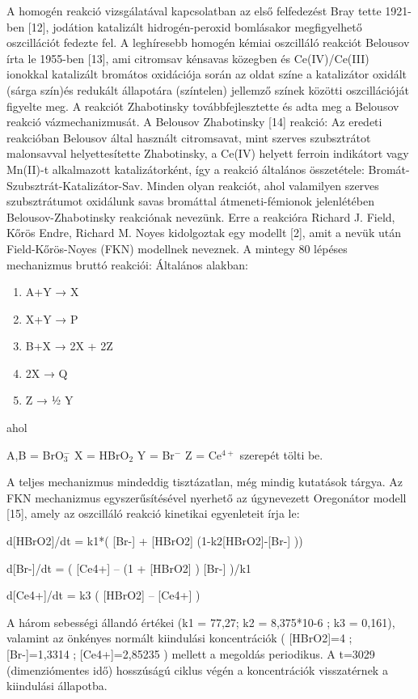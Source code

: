 A homogén reakció vizsgálatával kapcsolatban az első felfedezést Bray tette 1921-ben [12], jodátion katalizált hidrogén-peroxid bomlásakor megfigyelhető oszcillációt fedezte fel. A leghíresebb homogén kémiai oszcilláló reakciót Belousov írta le 1955-ben [13], ami citromsav kénsavas közegben és Ce(IV)/Ce(III) ionokkal katalizált bromátos oxidációja során az oldat színe a katalizátor oxidált (sárga szín)és redukált állapotára (színtelen) jellemző színek közötti oszcillációját figyelte meg.
 A reakciót Zhabotinsky továbbfejlesztette és adta meg a Belousov reakció vázmechanizmusát. A Belousov Zhabotinsky [14] reakció:
Az eredeti reakcióban Belousov által használt citromsavat, mint szerves szubsztrátot malonsavval helyettesítette Zhabotinsky, a Ce(IV) helyett ferroin indikátort vagy Mn(II)-t alkalmazott katalizátorként, így a reakció általános összetétele: Bromát-Szubsztrát-Katalizátor-Sav.
Minden olyan reakciót, ahol valamilyen szerves szubsztrátumot oxidálunk savas bromáttal átmeneti-fémionok jelenlétében Belousov-Zhabotinsky reakciónak nevezünk. Erre a reakcióra Richard J. Field, Kőrös Endre, Richard M. Noyes kidolgoztak egy modellt [2], amit a nevük után Field-Kőrös-Noyes (FKN) modellnek neveznek. A mintegy 80 lépéses mechanizmus bruttó reakciói:
Általános alakban:

\begin{enumerate}
\item A+Y → X
\item X+Y → P
\item B+X → 2X + 2Z
\item 2X → Q
\item Z → ½ Y
\end{enumerate}

ahol

A,B = BrO$_3^-$
X = HBrO$_2$
Y = Br$^-$
Z = Ce$^{4+}$ szerepét tölti be.

A teljes mechanizmus mindeddig tisztázatlan, még mindig kutatások tárgya. Az FKN mechanizmus egyszerűsítésével nyerhető az úgynevezett Oregonátor modell [15], amely az oszcilláló reakció kinetikai egyenleteit írja le:

\begin{center}
d[HBrO2]/dt = k1*( [Br-] + [HBrO2] (1-k2[HBrO2]-[Br-] ))

d[Br-]/dt = ( [Ce4+] – (1 + [HBrO2] ) [Br-] )/k1

d[Ce4+]/dt = k3 ( [HBrO2] – [Ce4+] )
\end{center}

A három sebességi állandó értékei (k1 = 77,27;    k2 = 8,375*10-6 ; k3 = 0,161), valamint az önkényes normált kiindulási koncentrációk ( [HBrO2]=4 ; [Br-]=1,3314 ; [Ce4+]=2,85235 ) mellett a megoldás periodikus. A t=3029 (dimenziómentes idő) hosszúságú ciklus végén a koncentrációk visszatérnek a kiindulási állapotba.

